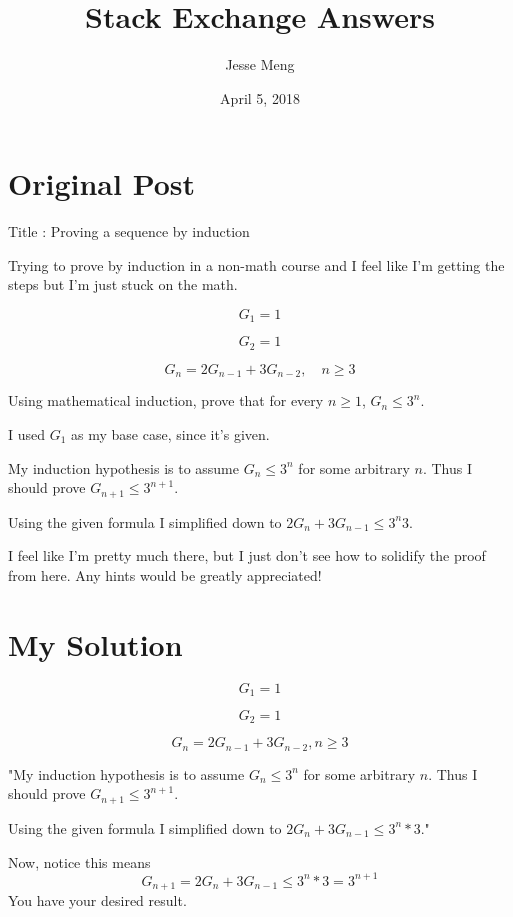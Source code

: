 \documentclass{article}
\title{Stack Exchange Answers}
\author{Jesse Meng }
\date{April 5, 2018}
\begin{document}
\maketitle

\section{Original Post}
Title : Proving a sequence by induction

Trying to prove by induction in a non-math course and I feel like I'm getting the steps but I'm just stuck on the math. 

$$G_1 = 1$$

$$G_2 = 1$$

$$G_n = 2G_{n−1} + 3G_{n−2}, \quad n \geq 3$$

Using mathematical induction, prove that for every $n ≥ 1$, $G_n ≤ 3^n$.

I used $G_1$ as my base case, since it’s given. 

My induction hypothesis is to assume $G_n \leq 3^n$ for some arbitrary $n$.
Thus I should prove $G_{n+1}\leq  3^{n+1}$.

Using the given formula I simplified down to $2G_n + 3G_{n-1} ≤ 3^n3$.

I feel like I'm pretty much there, but I just don't see how to solidify the proof from here. Any hints would be greatly appreciated!
\section{My Solution}
$$G_1 = 1$$

$$G_2 = 1$$

$$G_n = 2G_{n−1} + 3G_{n−2}, n \geq 3$$

"My induction hypothesis is to assume $G_n \leq 3^n$ for some arbitrary $n$.
Thus I should prove $G_{n+1}\leq  3^{n+1}$.

Using the given formula I simplified down to $2G_n + 3G_{n-1} ≤ 3^n * 3$."

Now, notice this means $$G_{n+1} = 2G_{n} + 3G_{n−1}\leq3^n*3=3^{n+1}$$ You have your desired result.
\end{document}
